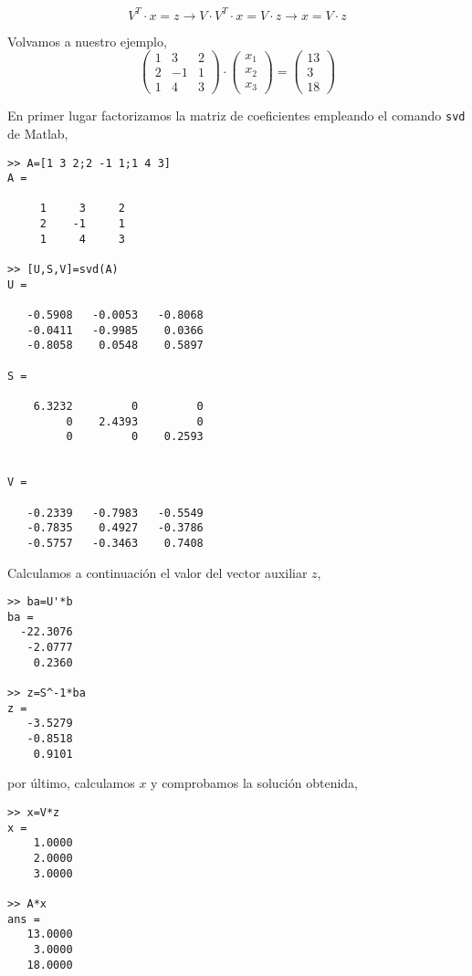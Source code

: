\begin{equation*}
V^T\cdot x=z \rightarrow V\cdot V^T\cdot x=V\cdot z \rightarrow x=V\cdot z
\end{equation*}

Volvamos a nuestro ejemplo,
\begin{equation*}
\begin{pmatrix}
1& 3& 2\\
2& -1& 1\\
1& 4& 3
\end{pmatrix}\cdot \begin{pmatrix}
x_1\\
x_2\\
x_3
\end{pmatrix}=\begin{pmatrix}
13\\
3\\
18
\end{pmatrix}
\end{equation*}

En primer lugar factorizamos la matriz de coeficientes empleando el comando \texttt{svd} de Matlab,

\begin{verbatim}
>> A=[1 3 2;2 -1 1;1 4 3]
A =

     1     3     2
     2    -1     1
     1     4     3

>> [U,S,V]=svd(A)
U =

   -0.5908   -0.0053   -0.8068
   -0.0411   -0.9985    0.0366
   -0.8058    0.0548    0.5897

S =

    6.3232         0         0
         0    2.4393         0
         0         0    0.2593


V =

   -0.2339   -0.7983   -0.5549
   -0.7835    0.4927   -0.3786
   -0.5757   -0.3463    0.7408

\end{verbatim}

Calculamos a continuación el valor del vector auxiliar $z$,

\begin{verbatim}
>> ba=U'*b
ba =
  -22.3076
   -2.0777
    0.2360

>> z=S^-1*ba
z =
   -3.5279
   -0.8518
    0.9101
\end{verbatim}
por último, calculamos $x$ y comprobamos la solución obtenida,

\begin{verbatim}
>> x=V*z
x =
    1.0000
    2.0000
    3.0000

>> A*x
ans =
   13.0000
    3.0000
   18.0000
\end{verbatim}


